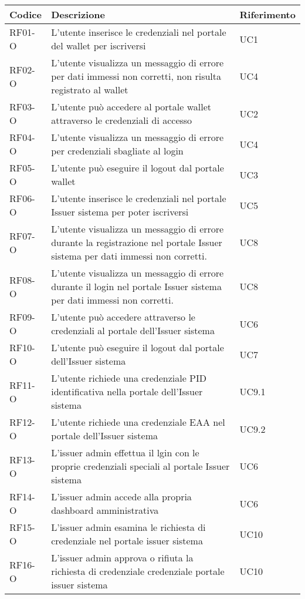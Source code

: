     \begin{longtable}{|p{}|p{}|p{}|}
        \hline
        \textbf{Codice} & \textbf{Descrizione} & \textbf{Riferimento} \\
        \hline
        RF01-O & L'utente inserisce le credenziali nel portale del wallet per iscriversi & UC1\\
        RF02-O & L'utente visualizza un messaggio di errore per dati immessi non corretti, non risulta registrato al wallet & UC4\\
        RF03-O & L'utente può accedere al portale wallet attraverso le credenziali di accesso & UC2\\
        RF04-O & L'utente visualizza un messaggio di errore per credenziali sbagliate al login & UC4\\ 
        RF05-O & L'utente può eseguire il logout dal portale wallet & UC3\\
        RF06-O & L'utente inserisce le credenziali nel portale Issuer sistema per poter iscriversi & UC5\\
        RF07-O & L'utente visualizza un messaggio di errore durante la registrazione nel portale Issuer sistema per dati immessi non corretti. & UC8\\
        RF08-O & L'utente visualizza un messaggio di errore durante il login nel portale Issuer sistema per dati immessi non corretti. & UC8\\
        RF09-O & L'utente può accedere attraverso le credenziali al portale dell'Issuer sistema & UC6\\
        RF10-O & L'utente può eseguire il logout dal portale dell'Issuer sistema & UC7\\
        RF11-O & L'utente richiede una credenziale PID identificativa nella portale dell'Issuer sistema & UC9.1\\
        RF12-O & L'utente richiede una credenziale EAA nel portale dell'Issuer sistema & UC9.2\\
        RF13-O & L'issuer admin effettua il lgin con le proprie credenziali speciali al portale Issuer sistema & UC6\\ 
        RF14-O & L'issuer admin accede alla propria dashboard amministrativa & UC6\\
        RF15-O & L'issuer admin esamina le richiesta di credenziale nel portale issuer sistema  & UC10\\
        RF16-O & L'issuer admin approva o rifiuta la richiesta di credenziale credenziale portale issuer sistema & UC10\\

\end{longtable}
